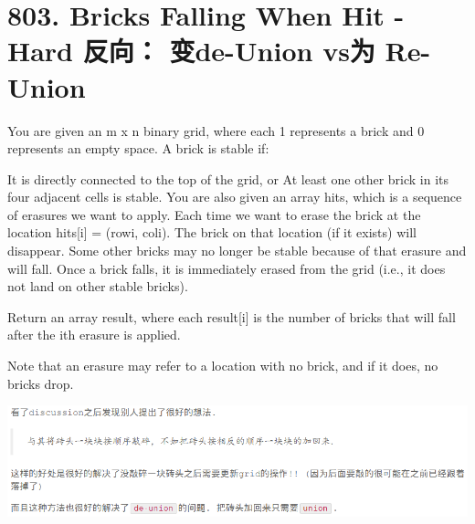 \documentclass[9pt, b5paaper]{book}
\begin{document}
\section{803. Bricks Falling When Hit - Hard 反向： 变de-Union vs为 Re-Union}
\label{sec-17-3}
You are given an m x n binary grid, where each 1 represents a brick and 0 represents an empty space. A brick is stable if:

It is directly connected to the top of the grid, or
At least one other brick in its four adjacent cells is stable.
You are also given an array hits, which is a sequence of erasures we want to apply. Each time we want to erase the brick at the location hits[i] = (rowi, coli). The brick on that location (if it exists) will disappear. Some other bricks may no longer be stable because of that erasure and will fall. Once a brick falls, it is immediately erased from the grid (i.e., it does not land on other stable bricks).

Return an array result, where each result[i] is the number of bricks that will fall after the ith erasure is applied.

Note that an erasure may refer to a location with no brick, and if it does, no bricks drop.

\includegraphics[width=.9\linewidth]{./pic/hitBricks.png}
\end{document}
